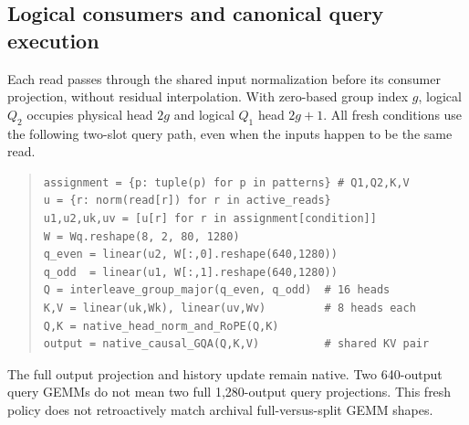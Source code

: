 \documentclass[11pt,letterpaper]{article}
\begin{document}
\subsection{Logical consumers and canonical query execution}
Each read passes through the shared input normalization before its consumer
projection, without residual interpolation.
With zero-based group
index $g$, logical $Q_2$ occupies physical head $2g$ and logical $Q_1$ head
$2g+1$. All fresh conditions use the following two-slot query path, even when
the inputs happen to be the same read.
\begin{quote}\small
\begin{verbatim}
assignment = {p: tuple(p) for p in patterns} # Q1,Q2,K,V
u = {r: norm(read[r]) for r in active_reads}
u1,u2,uk,uv = [u[r] for r in assignment[condition]]
W = Wq.reshape(8, 2, 80, 1280)
q_even = linear(u2, W[:,0].reshape(640,1280))
q_odd  = linear(u1, W[:,1].reshape(640,1280))
Q = interleave_group_major(q_even, q_odd)  # 16 heads
K,V = linear(uk,Wk), linear(uv,Wv)         # 8 heads each
Q,K = native_head_norm_and_RoPE(Q,K)
output = native_causal_GQA(Q,K,V)          # shared KV pair
\end{verbatim}
\end{quote}
The full output projection and history update remain native. Two 640-output
query GEMMs do not mean two full 1,280-output query projections. This fresh
policy does not retroactively match archival full-versus-split GEMM shapes.
\end{document}
